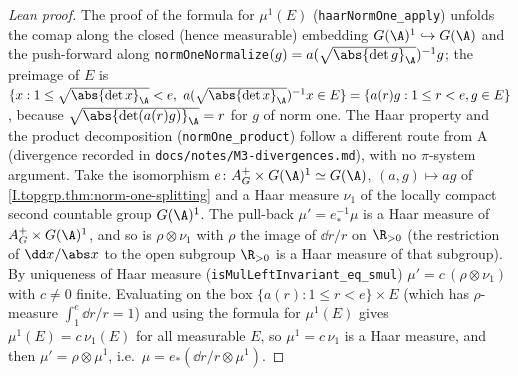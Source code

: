 \begin{proof}[Lean proof]
The proof of the formula for $\mu^1(E)$ (\texttt{haarNormOne\_apply}) unfolds the comap along the closed (hence measurable) embedding $G(\A)^1\hookrightarrow G(\A)$ and the push-forward along \texttt{normOneNormalize}$(g)=a(\sqrt{\abs{\det g}_\A})^{-1}g$; the preimage of $E$ is $\{x:1\le\sqrt{\abs{\det x}_\A}<e,\ a(\sqrt{\abs{\det x}_\A})^{-1}x\in E\}=\{a(r)g:1\le r<e,g\in E\}$, because $\sqrt{\abs{\det(a(r)g)}_\A}=r$ for $g$ of norm one. The Haar property and the product decomposition (\texttt{normOne\_product}) follow a different route from A (divergence recorded in \texttt{docs/notes/M3-divergences.md}), with no $\pi$-system argument. Take the isomorphism $e\colon A_G^+\times G(\A)^1\simeq G(\A)$, $(a,g)\mapsto ag$ of \cref{I.topgrp.thm:norm-one-splitting} and a Haar measure $\nu_1$ of the locally compact second countable group $G(\A)^1$. The pull-back $\mu'=e^{-1}_*\mu$ is a Haar measure of $A_G^+\times G(\A)^1$, and so is $\rho\otimes\nu_1$ with $\rho$ the image of $\dd r/r$ on $\R_{>0}$ (the restriction of $\dd x/\abs x$ to the open subgroup $\R_{>0}$ is a Haar measure of that subgroup). By uniqueness of Haar measure (\texttt{isMulLeftInvariant\_eq\_smul}) $\mu'=c\,(\rho\otimes\nu_1)$ with $c\ne0$ finite. Evaluating on the box $\{a(r):1\le r<e\}\times E$ (which has $\rho$-measure $\int_1^e\dd r/r=1$) and using the formula for $\mu^1(E)$ gives $\mu^1(E)=c\,\nu_1(E)$ for all measurable $E$, so $\mu^1=c\,\nu_1$ is a Haar measure, and then $\mu'=\rho\otimes\mu^1$, i.e.\ $\mu=e_*(\dd r/r\otimes\mu^1)$.
\end{proof}

